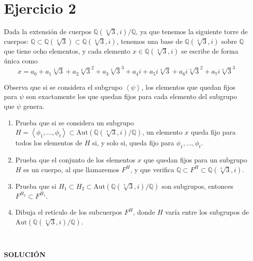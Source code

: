 \documentclass[a4paper]{article}
\begin{document}
\section{Ejercicio 2}
Dada la extensión de cuerpos $\mathds Q(\sqrt[4]3, i)/\mathds Q$, ya que tenemos la siguiente torre de cuerpos: $\mathds Q \subset \mathds Q(\sqrt[4]3) \subset \mathds Q(\sqrt[4]3, i)$, tenemos una base de $\mathds Q(\sqrt[4]3, i)$ sobre $\mathds Q$ que tiene ocho elementos, y cada elemento $x\in \mathds Q(\sqrt[4]3, i)$ se escribe de forma única como
\begin{equation*}
 x = a_0 + a_1\sqrt[4]3 + a_2{\sqrt[4]3}^2 + a_3{\sqrt[4]3}^3 + a_4 i + a_5 i\sqrt[4]3 + a_6 i{\sqrt[4]3}^2 + a_7 i{\sqrt[4]3}^3
\end{equation*}

Observa que si se considera el subgrupo $\left<\psi\right>$, los elementos que quedan fijos para $\psi$ son exactamente
los que quedan fijos para cada elemento del subgrupo que $\psi$ genera.

\begin{enumerate}
\item Prueba que si se considera un subgrupo $H=\left<\phi_1,\dots,\phi_t\right>\subset\mathrm{Aut}(\mathds Q(\sqrt[4]3, i)/\mathds Q)$, un elemento $x$ queda fijo para todos los elementos de $H$ si, y solo si, queda fijo para $\phi_1,\dots,\phi_t$.
\item Prueba que el conjunto de los elementos $x$ que quedan fijos para un subgrupo $H$ es un cuerpo, al que llamaremos $F^H$, y que verifica $\mathds Q\subset F^H\subset\mathds Q(\sqrt[4]3,i)$.
\item Prueba que si $H_1\subset H_2\subset \mathrm{Aut}(\mathds Q(\sqrt[4]3, i)/\mathds Q)$ son subgrupos, entonces $F^{H_2}\subset F^{H_1}$.
\item Dibuja el retículo de los subcuerpos $F^H$, donde $H$ varía entre los subgrupos de $\mathrm{Aut}(\mathds Q(\sqrt[4]3, i)/\mathds Q)$.
\end{enumerate}
\

\textbf{SOLUCIÓN}
\end{document}
